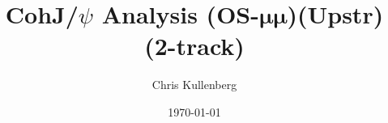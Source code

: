 \title{CohJ/$\psi$ Analysis (\textbf{OS}-$\boldsymbol{\mu\mu}$)(\textbf{Upstr})(\textbf{2-track})}
\author{Chris Kullenberg}
\date{\today}
